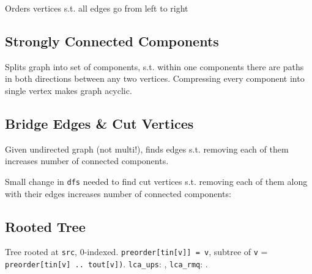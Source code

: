 Orders vertices s.t. all edges go from left to right

\subsection{Strongly Connected Components}

Splits graph into set of components, s.t. within one components there are paths in both directions between any two vertices. Compressing every component into single vertex makes graph acyclic. 

\subsection{Bridge Edges \& Cut Vertices}

Given undirected graph (not multi!), finds edges s.t. removing each of them increases number of connected components. 

Small change in \verb|dfs| needed to find cut vertices s.t. removing each of them along with their edges increases number of connected components:

\subsection{Rooted Tree}

Tree rooted at \verb|src|, 0-indexed. \verb|preorder[tin[v]] = v|, subtree of \verb|v| = \verb|preorder[tin[v] .. tout[v])|. \verb|lca_ups|: , \verb|lca_rmq|: .


